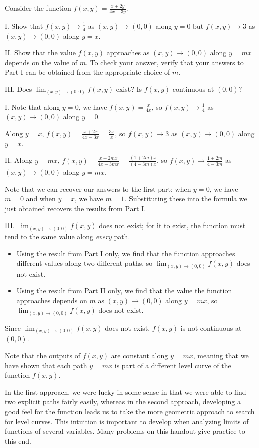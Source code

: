 \documentclass[noauthor, handout]{ximera}
\newcommand{\Lim}[2]{\lim_{#1 \to #2}}
\begin{document}
\begin{problem}
Consider the function $f(x,y) = \frac{x+2y}{4x-3y}$.

I. Show that $f(x,y) \to \frac{1}{4}$ as $(x,y) \to (0,0)$ along $y=0$ but $f(x,y) \to 3$ as $(x,y) \to (0,0)$ along $y=x$.  

II. Show that the value $f(x,y)$ approaches as $(x,y) \to (0,0)$ along $y=mx$ depends on the value of $m$.  To check your answer, verify that your answers to Part I can be obtained from the appropriate choice of $m$.

III. Does $\Lim{(x,y)}{(0,0)} f(x,y)$ exist?  Is $f(x,y)$ continuous at $(0,0)$?

\begin{freeResponse}

I. Note that along $y=0$, we have $f(x,y) = \frac{x}{4x}$, so $f(x,y) \to \frac{1}{4}$ as $(x,y) \to (0,0)$ along $y=0$.

Along $y=x$, $f(x,y) = \frac{x+2x}{4x-3x} = \frac{3x}{x}$, so $f(x,y) \to 3$ as $(x,y) \to (0,0)$ along $y=x$.

II. Along $y=mx$, $f(x,y) = \frac{x+2mx}{4x-3mx} = \frac{(1+2m)x}{(4-3m)x}$, so $f(x,y) \to \frac{1+2m}{4-3m}$ as $(x,y) \to (0,0)$ along $y=mx$.

Note that we can recover our answers to the first part; when $y=0$, we have $m=0$ and when $y=x$, we have $m=1$.  Substituting these into the formula we just obtained recovers the results from Part I.

III. $\Lim{(x,y)}{(0,0)} f(x,y)$ does not exist; for it to exist, the function must tend to the same value along \emph{every} path.  

\begin{itemize}
\item Using the result from Part I only, we find that the function approaches different values along two different paths, so $\Lim{(x,y)}{(0,0)} f(x,y)$ does not exist.
\item Using the result from Part II only, we find that the value the function approaches depends on $m$ as $(x,y) \to (0,0)$ along $y=mx$, so $\Lim{(x,y)}{(0,0)} f(x,y)$ does not exist.
\end{itemize}

Since $\Lim{(x,y)}{(0,0)} f(x,y)$ does not exist, $f(x,y)$ is not continuous at $(0,0)$.

\begin{remark}
Note that the outputs of $f(x,y)$ are constant along $y=mx$, meaning that we have shown that each path $y=mx$ is part of a different level curve of the function $f(x,y)$.  

In the first approach, we were lucky in some sense in that we were able to find two explicit paths fairly easily, whereas in the second approach, developing a good feel for the function leads us to take the more geometric approach to search for level curves.  This intuition is important to develop when analyzing limits of functions of several variables.  Many problems on this handout give practice to this end.
\end{remark}
\end{freeResponse}

\end{problem}
\end{document}
